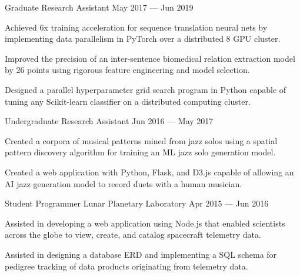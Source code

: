 \begin{cventries}
  \cventry
    {Graduate Research Assistant} %
    {} %
    {} %
    {May 2017 --- Jun 2019} %
    {
      \vspace{-0.1cm}
      \begin{cvitems} %
        \item Achieved 6x training acceleration for sequence translation neural nets by implementing data parallelism in PyTorch over a distributed 8 GPU cluster.
        \item Improved the precision of an inter-sentence biomedical relation extraction model by 26 points using rigorous feature engineering and model selection.
        \item Designed a parallel hyperparameter grid search program in Python capable of tuning any Scikit-learn classifier on a distributed computing cluster.
      \end{cvitems}
    }
    \vspace{.07cm}
  \cventry
    {Undergraduate Research Assistant} %
    {} %
    {} %
    {Jun 2016 --- May 2017} %
    {
      \vspace{-0.1cm}
      \begin{cvitems} %
        \item Created a corpora of musical patterns mined from jazz solos using a spatial pattern discovery algorithm for training an ML jazz solo generation model.
        \item Created a web application with Python, Flask, and D3.js capable of allowing an AI jazz generation model to record duets with a human musician.
      \end{cvitems}
    }
    \vspace{.2cm}
  \cventry
    {Student Programmer} %
    {Lunar Planetary Laboratory} %
    {Apr 2015 --- Jun 2016} %
    {} %
    {
      \vspace{-0.1cm}
      \begin{cvitems} %
        \item Assisted in developing a web application using Node.js that enabled scientists across the globe to view, create, and catalog spacecraft telemetry data.
        \item Assisted in designing a database ERD and implementing a SQL schema for pedigree tracking of data products originating from telemetry data.
      \end{cvitems}
    }

\end{cventries}
